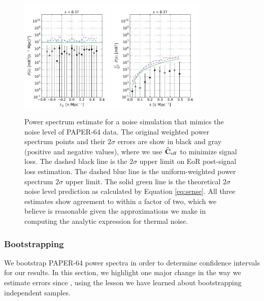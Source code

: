 \documentclass[preprint2,numberedappendix,tighten]{aastex6}
\begin{document}
\begin{figure}
	\centering
	\includegraphics[width=0.4\textwidth]{plots/ps1_noise_add.pdf}
	\includegraphics[width=0.4\textwidth]{plots/ps2_noise_add.pdf}
	\caption{Power spectrum estimate for a noise simulation that mimics the noise level of PAPER-64 data. The original weighted 
power spectrum points and their $2\sigma$ errors are show in black and gray (positive and negative values), where we use $
\widehat{\textbf{C}}_{\rm eff}$ to minimize signal loss. The dashed black line is the $2\sigma$ upper limit on EoR post-signal loss estimation. The dashed blue line is the uniform-weighted power spectrum $2\sigma$ upper 
limit. The solid green line is the theoretical $2\sigma$ noise level prediction as calculated by Equation \eqref{eq:sense}. All three 
estimates show agreement to within a factor of two, which we believe is reasonable given the approximations we make in computing the analytic expression for thermal noise.}
	\label{fig:ps_noise}
\end{figure}

\subsubsection{Bootstrapping}
\label{sec:Boot}

We bootstrap PAPER-64 power spectra in order to determine confidence intervals for our results. In this section, we highlight 
one major change in the way we estimate errors since , using the lesson we have learned about bootstrapping independent samples.
\end{document}
